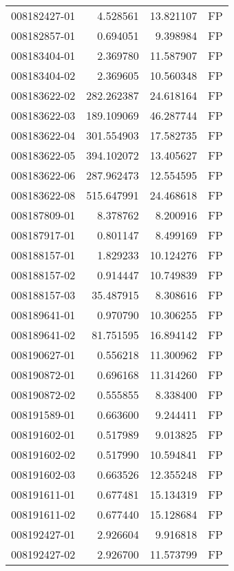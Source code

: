 \begin{tabular}{lrrl}
008182427-01 &    4.528561 &      13.821107 &   FP \\
008182857-01 &    0.694051 &       9.398984 &   FP \\
008183404-01 &    2.369780 &      11.587907 &   FP \\
008183404-02 &    2.369605 &      10.560348 &   FP \\
008183622-02 &  282.262387 &      24.618164 &   FP \\
008183622-03 &  189.109069 &      46.287744 &   FP \\
008183622-04 &  301.554903 &      17.582735 &   FP \\
008183622-05 &  394.102072 &      13.405627 &   FP \\
008183622-06 &  287.962473 &      12.554595 &   FP \\
008183622-08 &  515.647991 &      24.468618 &   FP \\
008187809-01 &    8.378762 &       8.200916 &   FP \\
008187917-01 &    0.801147 &       8.499169 &   FP \\
008188157-01 &    1.829233 &      10.124276 &   FP \\
008188157-02 &    0.914447 &      10.749839 &   FP \\
008188157-03 &   35.487915 &       8.308616 &   FP \\
008189641-01 &    0.970790 &      10.306255 &   FP \\
008189641-02 &   81.751595 &      16.894142 &   FP \\
008190627-01 &    0.556218 &      11.300962 &   FP \\
008190872-01 &    0.696168 &      11.314260 &   FP \\
008190872-02 &    0.555855 &       8.338400 &   FP \\
008191589-01 &    0.663600 &       9.244411 &   FP \\
008191602-01 &    0.517989 &       9.013825 &   FP \\
008191602-02 &    0.517990 &      10.594841 &   FP \\
008191602-03 &    0.663526 &      12.355248 &   FP \\
008191611-01 &    0.677481 &      15.134319 &   FP \\
008191611-02 &    0.677440 &      15.128684 &   FP \\
008192427-01 &    2.926604 &       9.916818 &   FP \\
008192427-02 &    2.926700 &      11.573799 &   FP \\

\end{tabular}
